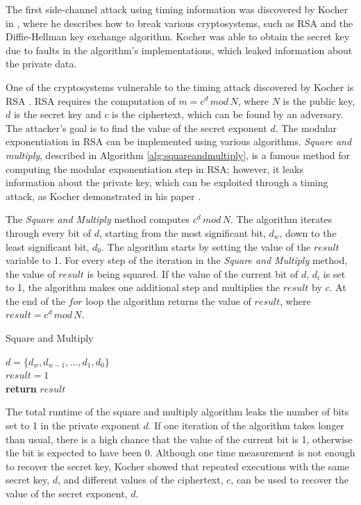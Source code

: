 \documentclass[10pt,a4paper,twoside]{book}
\begin{document}
The first side-channel attack using timing information was discovered by Kocher in \cite{kocher1996timing}, where he describes how to break various cryptosystems, such as RSA \cite{rivest1978method} and the Diffie-Hellman \cite{diffie1976new} key exchange algorithm. Kocher was able to obtain the secret key due to faults in the algorithm's implementations, which leaked information about the private data.

One of the cryptosystems vulnerable to the timing attack discovered by Kocher \cite{kocher1996timing} is RSA \cite{rivest1978method}. RSA requires the computation of $m = c^d \, mod \, N$, where $N$ is the public key, $d$ is the secret key and $c$ is the ciphertext, which can be found by an adversary. The attacker's goal is to find the value of the secret exponent $d$. The modular exponentiation in RSA can be implemented using various algorithms. \textit{Square and multiply}, described in Algorithm \ref{alg:squareandmultiply}, is a famous method for computing the modular exponentiation step in RSA; however, it leaks information about the private key, which can be exploited through a timing attack, as Kocher demonstrated in his paper \cite{kocher1996timing}.

The \textit{Square and Multiply} method computes $c^d \, mod \, N$. The algorithm iterates through every bit of $d$, starting from the most significant bit, $d_w$, down to the least significant bit, $d_0$. The algorithm starts by setting the value of the $result$ variable to 1. For every step of the iteration in the \textit{Square and Multiply} method, the value of $result$ is being squared. If the value of the current bit of $d$, $d_i$ is set to 1, the algorithm makes one additional step and multiplies the $result$ by $c$. At the end of the $for$ loop the algorithm returns the value of $result$, where $result = c^d \, mod \, N$.

\begin{algorithm}
\caption{Square and Multiply \cite{menezes1996handbook}}
\label{alg:squareandmultiply}
$d = \{d_w, d_{w-1}, ..., d_1, d_0\}$\\
$result = 1$\\
{\bf return} $result$
\end{algorithm}

The total runtime of the square and multiply algorithm leaks the number of bits set to 1 in the private exponent $d$. If one iteration of the algorithm takes longer than usual, there is a high chance that the value of the current bit is 1, otherwise the bit is expected to have been 0. Although one time measurement is not enough to recover the secret key, Kocher\cite{kocc2009cryptographic} showed that repeated executions with the same secret key, $d$, and different values of the ciphertext, $c$, can be used to recover the value of the secret exponent, $d$.
\end{document}
